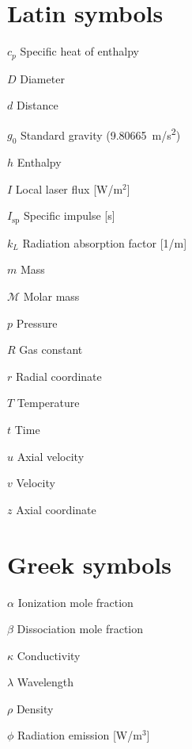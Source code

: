 \begin{multicols*}{2}
    \section*{Latin symbols}
    \begin{nomlist}
        \item[$c_p$]            Specific heat of enthalpy
        \item[$D$]              Diameter
        \item[$d$]              Distance
        \item[$g_0$]            Standard gravity (9.80665~\unit{m/s^2}) 
        \item[$h$]              Enthalpy
        \item[$I$]              Local laser flux [W/m$^2$]
        \item[$I_\text{sp}$]    Specific impulse [s]
        \item[$k_L$]            Radiation absorption factor [1/m]
        \item[$m$]              Mass
        \item[$\mathcal{M}$]    Molar mass
        \item[$p$]              Pressure
        \item[$R$]              Gas constant
        \item[$r$]              Radial coordinate
        \item[$T$]              Temperature
        \item[$t$]              Time
        \item[$u$]              Axial velocity
        \item[$v$]              Velocity 
        \item[$z$]              Axial coordinate
    \end{nomlist}

    \section*{Greek symbols}
    \begin{nomlist}
        \item[$\alpha$]         Ionization mole fraction
        \item[$\beta$]          Dissociation mole fraction
        \item[$\kappa$]         Conductivity
        \item[$\lambda$]        Wavelength
        \item[$\rho$]           Density
        \item[$\phi$]           Radiation emission [W/m$^3$]
    \end{nomlist}


\end{multicols*}
